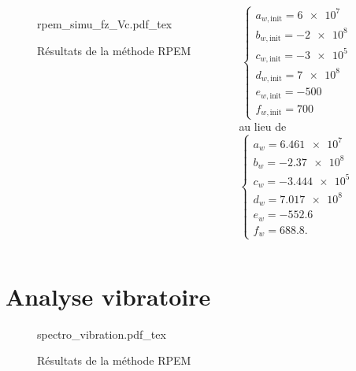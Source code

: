 \documentclass{style/presentation}
\begin{document}
\begin{frame}
    \begin{columns}[c]
        \begin{figure}
            \centering
            {\fontsize{3.5pt}{5pt}\selectfont
                \def\svgwidth{\textwidth}
                {rpem_simu_fz_Vc.pdf_tex}}
            \caption{Résultats de la méthode RPEM}
        \end{figure}
        \begin{equation*}
            \left\{
            \begin{array}{l}
                a_{w,\text{init}} = \num{6e7}  \\
                b_{w,\text{init}} = \num{-2e8} \\
                c_{w,\text{init}} = \num{-3e5} \\
                d_{w,\text{init}} = \num{7e8}  \\
                e_{w,\text{init}} = \num{-500} \\
                f_{w,\text{init}} = \num{700}
            \end{array}
            \right.
        \end{equation*}
        au lieu de
        \begin{equation*}
            \left\{
            \begin{array}{l}
                a_{w} = \num{6.461e7}  \\
                b_{w} = \num{-2.37e8}  \\
                c_{w} = \num{-3.444e5} \\
                d_{w} = \num{7.017e8}  \\
                e_{w} = \num{-552.6}   \\
                f_{w} = \num{688.8}.
            \end{array}
            \right.
        \end{equation*}
    \end{columns}
\end{frame}

\section{Analyse vibratoire}
\begin{frame}
    \begin{figure}
        \centering
        \def\svgwidth{\textwidth}
        {spectro_vibration.pdf_tex}
        \caption{Résultats de la méthode RPEM}
    \end{figure}
\end{frame}
\end{document}
